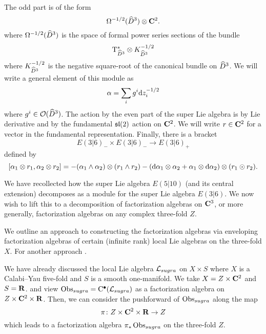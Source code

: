 \documentclass[11pt]{amsart}
\begin{document}
The odd part is of the form
\[
\Omega^{-1/2}(\Hat{D}^3) \otimes \C^2 .
\]
where $\Omega^{-1/2}(\Hat{D}^3)$ is the space of formal power series sections of the bundle
\[
\T_{\Hat{D}^3}^{*} \otimes K_{\Hat{D}^3}^{-1/2}
\]
where $K_{\Hat{D}^3}^{-1/2}$ is the negative square-root of the canonical bundle on $\Hat{D}^3$. 
We will write a general element of this module as 
\[
\alpha = \sum_i g^i \d z_i^{-1/2} 
\]
where $g^i \in \cO(\Hat{D}^3)$. 
The action by the even part of the super Lie algebra is by Lie derivative and by the fundamental $\lie{sl}(2)$ action on $\C^2$.
We will write $r \in \C^2$ for a vector in the fundamental representation.
Finally, there is a bracket 
\[
E(3|6)_- \times E(3|6)_- \to E(3|6)_+
\]
defined by
\[
[\alpha_1 \otimes r_1, \alpha_2 \otimes r_2] = - (\alpha_1 \wedge \alpha_2) \otimes (r_1 \wedge r_2) - (\d \alpha_1 \otimes \alpha_2 + \alpha_1 \otimes \d \alpha_2) \otimes (r_1 \odot r_2) .
\]


\parsec[s:weight]


\parsec[s:locallieE510]

We have recollected how the super Lie algebra $E(5|10)$ (and its central extension) decomposes as a module for the super Lie algebra $E(3|6)$. 
We now wish to lift this to a decomposition of factorization algebras on $\C^3$, or more generally, factorization algebras on any complex three-fold $Z$. 

We outline an approach to constructing the factorization algebras via enveloping factorization algebras of certain (infinite rank) local Lie algebras on the three-fold $X$. 
For another approach . 

We have already discussed the local Lie algebra $\cL_{sugra}$ on $X \times S$ where $X$ is a Calabi--Yau five-fold and $S$ is a smooth one-manifold. 
We take $X = Z \times \C^2$ and $S = \R$. 
and view $\Obs_{sugra} = \clie^\bu(\cL_{sugra})$ as a factorization algebra on $Z \times \C^2 \times \R$. 
Then, we can consider the pushforward of $\Obs_{sugra}$ along the map
\[
\pi \colon Z \times \C^2 \times \R \to Z 
\]
which leads to a factorization algebra $\pi_* \Obs_{sugra}$ on the three-fold $Z$. 
\end{document}
